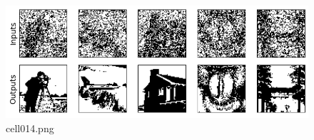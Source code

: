 \begin{figure}[ht]
	\centering
	\includegraphics[scale=0.8, max width=\linewidth]{./fig/energy-based-model/hopfield-model/cell014.png}
	\caption{cell014.png}
	\label{cell014.png}
\end{figure}